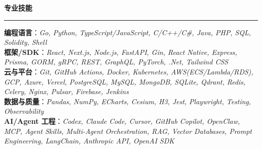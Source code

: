 \documentclass[10pt,a4paper]{article}
\begin{document}
\noindent\textbf{专业技能}\\[-0.2em]
  \rule{\textwidth}{0.2pt}
  \textbf{编程语言}：\textit{Go, Python, TypeScript/JavaScript, C/C++/C\#, Java,
   PHP, SQL, Solidity, Shell}\\
  \textbf{框架/SDK}：\textit{React, Next.js, Node.js, FastAPI, Gin, React Native, Express,
  Prisma, GORM, gRPC, REST, GraphQL, PyTorch, .Net, Tailwind CSS}\\
  \textbf{云与平台}：\textit{Git, GitHub Actions, Docker, Kubernetes, AWS(ECS/Lambda/RDS), GCP, Azure, Vercel,
  PostgreSQL, MySQL, MongoDB, SQLite, Qdrant, Redis, Celery, Nginx, Pulsar, Firebase, Jenkins}\\
  \textbf{数据与质量}：\textit{Pandas, NumPy, ECharts, Cesium, H3, Jest, Playwright, Testing, Observability}\\
  \textbf{AI/Agent 工程}：\textit{Codex, Claude Code, Cursor, GitHub Copilot, OpenClaw,
  MCP, Agent Skills, Multi-Agent Orchestration, RAG, Vector Databases, Prompt Engineering, LangChain, Anthropic API, OpenAI SDK}
  \vspace{0.2em}
\end{document}
